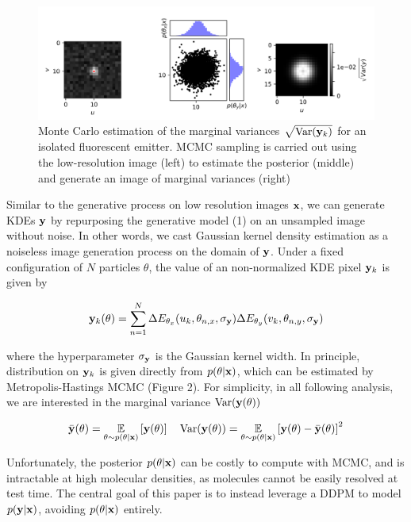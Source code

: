 \documentclass{article}
\begin{document}
\begin{figure}
\includegraphics[scale=0.7]{MCMC.png}
\caption{Monte Carlo estimation of the marginal variances $\sqrt{\mathrm{Var}(\bold{y}_k)}$ for an isolated fluorescent emitter. MCMC sampling is carried out using the low-resolution image (left) to estimate the posterior (middle) and generate an image of marginal variances (right)}
\end{figure}

Similar to the generative process on low resolution images $\bold{x}$, we can generate KDEs $\bold{y}$ by repurposing the generative model (1) on an unsampled image without noise. In other words, we cast Gaussian kernel density estimation as a noiseless image generation process on the domain of $\bold{y}$. Under a fixed configuration of $N$ particles $\theta$, the value of an non-normalized KDE pixel $\bold{y}_{k}$ is given by

\begin{equation}
\bold{y}_{k}(\theta) = \sum_{n=1}^{N}\Delta E_{\theta_x}(u_{k},\theta_{n,x},\sigma_{\bold{y}}) \Delta E_{\theta_y}(v_{k},\theta_{n,y},\sigma_{\bold{y}})
\end{equation}

where the hyperparameter $\sigma_{\bold{y}}$ is the Gaussian kernel width. In principle, distribution on $\bold{y}_{k}$ is given directly from $p(\theta|\bold{x})$, which can be estimated by Metropolis-Hastings MCMC (Figure 2). For simplicity, in all following analysis, we are interested in the marginal variance $\mathrm{Var} (\bold{y}(\theta))$

\begin{equation}
\bar{\bold{y}}(\theta) = \underset{\theta\sim p(\theta|\bold{x})}{\mathbb{E}}\left[ \bold{y}(\theta)\right] \quad \mathrm{Var} (\bold{y}(\theta)) = \underset{\theta\sim p(\theta|\bold{x})}{\mathbb{E}}\left[ \bold{y}(\theta)-\bar{\bold{y}}(\theta)\right]^2
\end{equation}

Unfortunately, the posterior $p(\theta|\bold{x})$ can be costly to compute with MCMC, and is intractable at high molecular densities, as molecules cannot be easily resolved at test time. The central goal of this paper is to instead leverage a DDPM to model $p(\bold{y}|\bold{x})$, avoiding $p(\theta|\bold{x})$ entirely.
\end{document}
